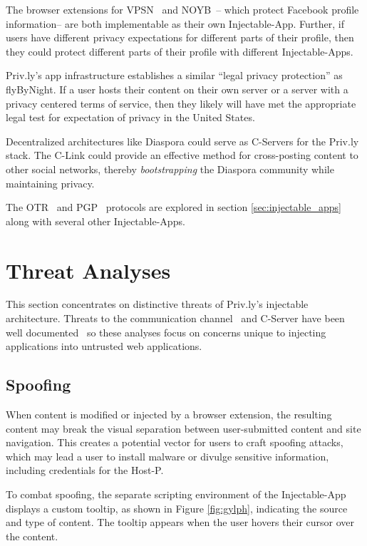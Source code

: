 \documentclass[letterpaper,twocolumn,10pt]{article}
\begin{document}
The browser extensions for VPSN~\cite{Conti2011} and NOYB~\cite{Guha2008}-- which protect Facebook profile information-- are both implementable as their own Injectable-App.
Further, if users have different privacy expectations for different parts of their profile, then they could protect different parts of their profile with different Injectable-Apps.

Priv.ly's app infrastructure establishes a similar ``legal privacy protection'' as flyByNight. 
If a user hosts their content on their own server or a server with a privacy centered terms of service,
then they likely will have met the appropriate legal test for expectation of privacy in the United States.

Decentralized architectures like Diaspora could serve as C-Servers for the Priv.ly 
stack. The C-Link could provide an effective method for cross-posting content to 
other social networks, thereby \emph{bootstrapping} the Diaspora community while 
maintaining privacy.

The OTR~\cite{Goldberg} and PGP~\cite{garfinkel1994pgp} protocols are explored in section
\ref{sec:injectable_apps} along with several other Injectable-Apps.


\section{Threat Analyses} \label{sec:privly_security_analyses}

This section concentrates on distinctive threats of Priv.ly's injectable
architecture. Threats to the communication channel~\cite{Goodin2013} and C-Server have been well
documented~\cite{Goodin2013a} so these analyses focus on concerns unique to injecting applications into untrusted web applications. 

\subsection{Spoofing} \label{sec:privly_spoofing}

When content is modified or injected by a browser extension, the resulting content 
may break the visual separation between user-submitted content and site 
navigation. This creates a potential vector for users to craft spoofing attacks, 
which may lead a user to install malware or divulge sensitive information, 
including credentials for the Host-P.

To combat spoofing, the separate scripting environment of the Injectable-App 
displays a custom tooltip, as shown in Figure \ref{fig:gylph}, indicating the source and type of content. The tooltip 
appears when the user hovers their cursor over the content.
\end{document}

